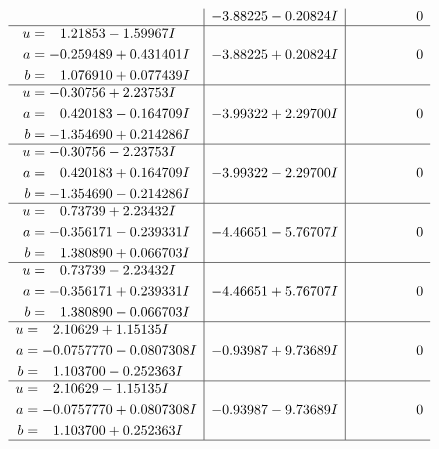\documentclass[1p]{elsarticle_modified}
\theoremstyle{definition}
\begin{document}
$$\begin{array}{c|c|c}
 & -3.88225 - 0.20824 I & \phantom{-0.000000 } 0 \\ \hline\begin{aligned}
u &= \phantom{-}1.21853 - 1.59967 I \\
a &= -0.259489 + 0.431401 I \\
b &= \phantom{-}1.076910 + 0.077439 I\end{aligned}
 & -3.88225 + 0.20824 I & \phantom{-0.000000 } 0 \\ \hline\begin{aligned}
u &= -0.30756 + 2.23753 I \\
a &= \phantom{-}0.420183 - 0.164709 I \\
b &= -1.354690 + 0.214286 I\end{aligned}
 & -3.99322 + 2.29700 I & \phantom{-0.000000 } 0 \\ \hline\begin{aligned}
u &= -0.30756 - 2.23753 I \\
a &= \phantom{-}0.420183 + 0.164709 I \\
b &= -1.354690 - 0.214286 I\end{aligned}
 & -3.99322 - 2.29700 I & \phantom{-0.000000 } 0 \\ \hline\begin{aligned}
u &= \phantom{-}0.73739 + 2.23432 I \\
a &= -0.356171 - 0.239331 I \\
b &= \phantom{-}1.380890 + 0.066703 I\end{aligned}
 & -4.46651 - 5.76707 I & \phantom{-0.000000 } 0 \\ \hline\begin{aligned}
u &= \phantom{-}0.73739 - 2.23432 I \\
a &= -0.356171 + 0.239331 I \\
b &= \phantom{-}1.380890 - 0.066703 I\end{aligned}
 & -4.46651 + 5.76707 I & \phantom{-0.000000 } 0 \\ \hline\begin{aligned}
u &= \phantom{-}2.10629 + 1.15135 I \\
a &= -0.0757770 - 0.0807308 I \\
b &= \phantom{-}1.103700 - 0.252363 I\end{aligned}
 & -0.93987 + 9.73689 I & \phantom{-0.000000 } 0 \\ \hline\begin{aligned}
u &= \phantom{-}2.10629 - 1.15135 I \\
a &= -0.0757770 + 0.0807308 I \\
b &= \phantom{-}1.103700 + 0.252363 I\end{aligned}
 & -0.93987 - 9.73689 I & \phantom{-0.000000 } 0\\
 \hline 
 \end{array}$$\newpage\newpage\renewcommand{\arraystretch}{1}
\end{document}
